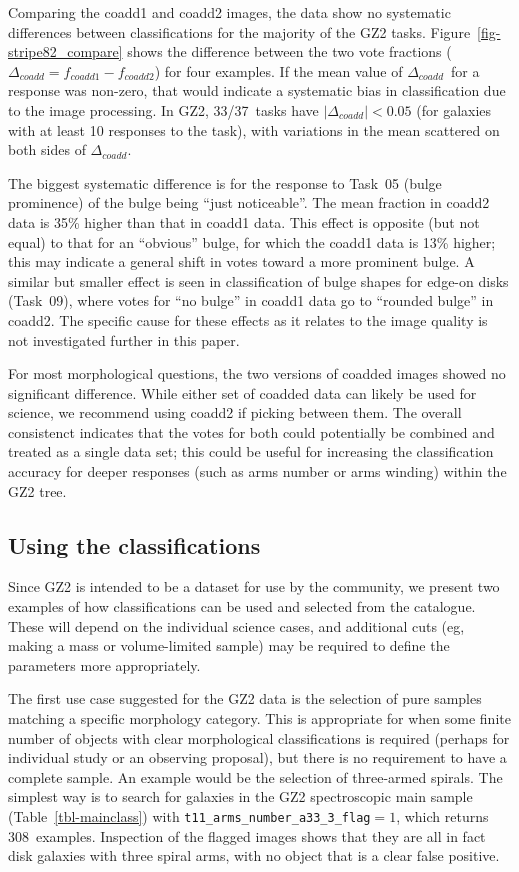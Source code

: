 \documentclass[useAMS,usenatbib]{mn2e}
\newcommand{\dcoadd}{$\Delta_{coadd}$}
\begin{document}
Comparing the coadd1 and coadd2 images, the data show no systematic differences between classifications for the majority of the GZ2 tasks. Figure~\ref{fig-stripe82_compare} shows the difference between the two vote fractions ($\Delta_{coadd} = f_{coadd1} - f_{coadd2}$) for four examples. If the mean value of \dcoadd~for a response was non-zero, that would indicate a systematic bias in classification due to the image processing. In GZ2, 33/37~tasks have $|\Delta_{coadd}| < 0.05$ (for galaxies with at least 10 responses to the task), with variations in the mean scattered on both sides of \dcoadd. 

The biggest systematic difference is for the response to Task~05 (bulge prominence) of the bulge being ``just noticeable''. The mean fraction in coadd2 data is 35\% higher than that in coadd1 data. This effect is opposite (but not equal) to that for an ``obvious'' bulge, for which the coadd1 data is 13\% higher; this may indicate a general shift in votes toward a more prominent bulge. A similar but smaller effect is seen in classification of bulge shapes for edge-on disks (Task~09), where votes for ``no bulge'' in coadd1 data go to ``rounded bulge'' in coadd2. The specific cause for these effects as it relates to the image quality is not investigated further in this paper. 

For most morphological questions, the two versions of coadded images showed no significant difference. While either set of coadded data can likely be used for science, we recommend using coadd2 if picking between them. The overall consistenct indicates that the votes for both could potentially be combined and treated as a single data set; this could be useful for increasing the classification accuracy for deeper responses (such as arms number or arms winding) within the GZ2 tree.

\subsection{Using the classifications}\label{ssec-usingdata}

Since GZ2 is intended to be a dataset for use by the community, we present two examples of how classifications can be used and selected from the catalogue. These will depend on the individual science cases, and additional cuts (eg, making a mass or volume-limited sample) may be required to define the parameters more appropriately.

The first use case suggested for the GZ2 data is the selection of pure samples matching a specific morphology category. This is appropriate for when some finite number of objects with clear morphological classifications is required (perhaps for individual study or an observing proposal), but there is no requirement to have a complete sample. An example would be the selection of three-armed spirals. The simplest way is to search for galaxies in the GZ2 spectroscopic main sample (Table~\ref{tbl-mainclass}) with {\tt t11\_arms\_number\_a33\_3\_flag}$ = 1$, which returns 308~examples. Inspection of the flagged images shows that they are all in fact disk galaxies with three spiral arms, with no object that is a clear false positive. 
\end{document}
